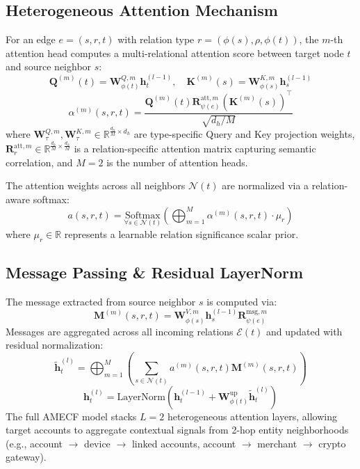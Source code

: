 \documentclass[conference]{IEEEtran}
\begin{document}
\subsection{Heterogeneous Attention Mechanism}
For an edge $e = (s, r, t)$ with relation type $r = (\phi(s), \rho, \phi(t))$, the $m$-th attention head computes a multi-relational attention score between target node $t$ and source neighbor $s$:
\begin{equation}
    \mathbf{Q}^{(m)}(t) = \mathbf{W}_{\phi(t)}^{Q, m} \mathbf{h}_t^{(l-1)}, \quad \mathbf{K}^{(m)}(s) = \mathbf{W}_{\phi(s)}^{K, m} \mathbf{h}_s^{(l-1)}
\end{equation}
\begin{equation}
    \alpha^{(m)}(s, r, t) = \frac{\mathbf{Q}^{(m)}(t) \mathbf{R}_{\psi(e)}^{\text{att}, m} (\mathbf{K}^{(m)}(s))^\top}{\sqrt{d_h / M}}
\end{equation}
where $\mathbf{W}_\tau^{Q, m}, \mathbf{W}_\tau^{K, m} \in \mathbb{R}^{\frac{d_h}{M} \times d_h}$ are type-specific Query and Key projection weights, $\mathbf{R}_r^{\text{att}, m} \in \mathbb{R}^{\frac{d_h}{M} \times \frac{d_h}{M}}$ is a relation-specific attention matrix capturing semantic correlation, and $M = 2$ is the number of attention heads.

The attention weights across all neighbors $\mathcal{N}(t)$ are normalized via a relation-aware softmax:
\begin{equation}
    a(s, r, t) = \underset{\forall s \in \mathcal{N}(t)}{\text{Softmax}} \left( \bigoplus_{m=1}^M \alpha^{(m)}(s, r, t) \cdot \mu_r \right)
\end{equation}
where $\mu_r \in \mathbb{R}$ represents a learnable relation significance scalar prior.

\subsection{Message Passing \& Residual LayerNorm}
The message extracted from source neighbor $s$ is computed via:
\begin{equation}
    \mathbf{M}^{(m)}(s, r, t) = \mathbf{W}_{\phi(s)}^{V, m} \mathbf{h}_s^{(l-1)} \mathbf{R}_{\psi(e)}^{\text{msg}, m}
\end{equation}
Messages are aggregated across all incoming relations $\mathcal{E}(t)$ and updated with residual normalization:
\begin{equation}
    \tilde{\mathbf{h}}_t^{(l)} = \bigoplus_{m=1}^M \left( \sum_{s \in \mathcal{N}(t)} a^{(m)}(s, r, t) \mathbf{M}^{(m)}(s, r, t) \right)
\end{equation}
\begin{equation}
    \mathbf{h}_t^{(l)} = \text{LayerNorm}\left( \mathbf{h}_t^{(l-1)} + \mathbf{W}_{\phi(t)}^{\text{up}} \tilde{\mathbf{h}}_t^{(l)} \right)
\end{equation}
The full AMECF model stacks $L = 2$ heterogeneous attention layers, allowing target accounts to aggregate contextual signals from 2-hop entity neighborhoods (e.g., account $\to$ device $\to$ linked accounts, account $\to$ merchant $\to$ crypto gateway).
\end{document}

